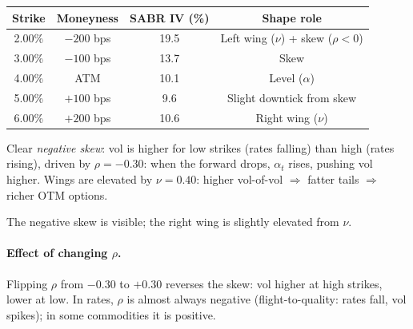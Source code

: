 \begin{center}
\begin{tabular}{cccc}
  \toprule
  Strike & Moneyness & SABR IV (\%) & Shape role \\
  \midrule
  2.00\% & $-200$ bps & 19.5 & Left wing ($\nu$) + skew ($\rho < 0$) \\
  3.00\% & $-100$ bps & 13.7 & Skew \\
  4.00\% & ATM        & 10.1 & Level ($\alpha$) \\
  5.00\% & $+100$ bps &  9.6 & Slight downtick from skew \\
  6.00\% & $+200$ bps & 10.6 & Right wing ($\nu$) \\
  \bottomrule
\end{tabular}
\end{center}

Clear \emph{negative skew}: vol is higher for low strikes (rates
falling) than high (rates rising), driven by $\rho = -0.30$: when
the forward drops, $\alpha_t$ rises, pushing vol higher.  Wings are
elevated by $\nu = 0.40$: higher vol-of-vol $\Rightarrow$ fatter
tails $\Rightarrow$ richer OTM options.

\begin{center}
\end{center}

The negative skew is visible; the right wing is slightly elevated
from $\nu$.

\paragraph{Effect of changing $\rho$.}
Flipping $\rho$ from $-0.30$ to $+0.30$ reverses the skew: vol higher
at high strikes, lower at low.  In rates, $\rho$ is almost always
negative (flight-to-quality: rates fall, vol spikes); in some
commodities it is positive.

